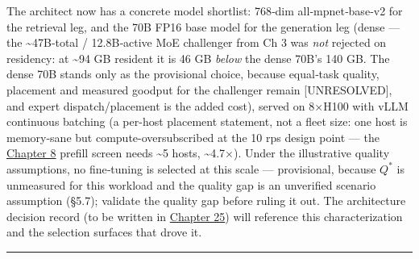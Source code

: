 The architect now has a concrete model shortlist: 768‑dim
all‑mpnet‑base‑v2 for the retrieval leg, and the 70B FP16 base model for
the generation leg (dense --- the \textasciitilde47B‑total /
12.8B‑active MoE challenger from Ch 3 was \emph{not} rejected on
residency: at \textasciitilde94 GB resident it is 46 GB \emph{below} the
dense 70B's 140 GB. The dense 70B stands only as the provisional choice,
because equal‑task quality, placement and measured goodput for the
challenger remain \mbox{{[}UNRESOLVED{]}}, and expert dispatch/placement is the
added cost), served on 8×H100 with vLLM continuous batching (a per-host
placement statement, not a fleet size: one host is memory-sane but
compute-oversubscribed at the 10 rps design point --- the \hyperref[chap:8]{Chapter 8}
prefill screen needs \textasciitilde5 hosts, \textasciitilde4.7×). Under
the illustrative quality assumptions, no fine‑tuning is selected at this
scale --- provisional, because \(Q^*\) is unmeasured for this workload
and the quality gap is an unverified scenario assumption (§5.7);
validate the quality gap before ruling it out. The architecture decision
record (to be written in \hyperref[chap:25]{Chapter 25}) will reference this
characterization and the selection surfaces that drove it.

\begin{center}\rule{0.5\linewidth}{0.5pt}\end{center}

